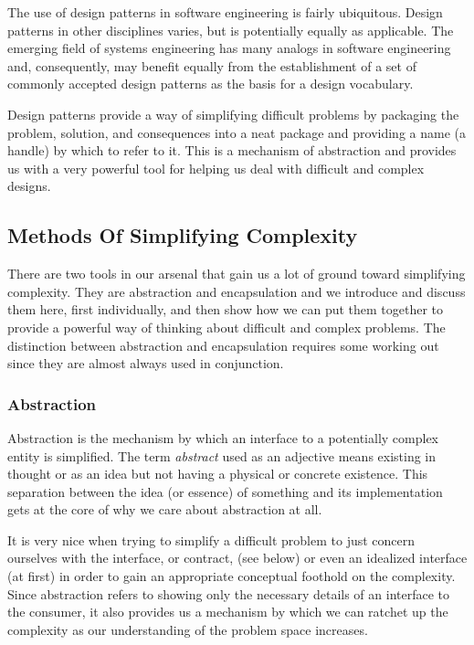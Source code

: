 \documentclass[jou,apacite]{apa6}
\begin{document}
The use of design patterns in software engineering is fairly ubiquitous.  Design patterns in other disciplines varies, but is potentially equally as applicable.  The emerging field of systems engineering has many analogs in software engineering and, consequently, may benefit equally from the establishment of a set of commonly accepted design patterns as the basis for a design vocabulary.

Design patterns provide a way of simplifying difficult problems by packaging the problem, solution, and consequences into a neat package and providing a name (a handle) by which to refer to it.  This is a mechanism of abstraction and provides us with a very powerful tool for helping us deal with difficult and complex designs.

\subsection{Methods Of Simplifying Complexity}  %
There are two tools in our arsenal that gain us a lot of ground toward simplifying complexity.  They are abstraction and encapsulation and we introduce and discuss them here, first individually, and then show how we can put them together to provide a powerful way of thinking about difficult and complex problems.  The distinction between abstraction and encapsulation requires some working out since they are almost always used in conjunction.

\subsubsection{Abstraction}
Abstraction is the mechanism by which an interface to a potentially complex entity is simplified.  The term \emph{abstract} used as an adjective means existing in thought or as an idea but not having a physical or concrete existence.  This separation between the idea (or essence) of something and its implementation gets at the core of why we care about abstraction at all.  

It is very nice when trying to simplify a difficult problem to just concern ourselves with the interface, or contract, (see below) or even an idealized interface (at first) in order to gain an appropriate conceptual foothold on the complexity.  Since abstraction refers to showing only the necessary details of an interface to the consumer, it also provides us a mechanism by which we can ratchet up the complexity as our understanding of the problem space increases.
\end{document}
